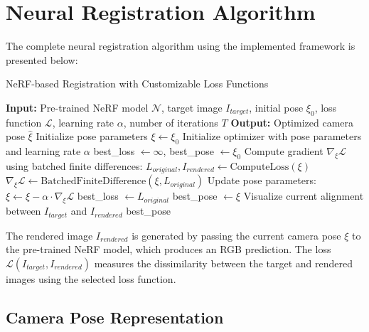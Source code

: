 \section{Neural Registration Algorithm}

The complete neural registration algorithm using the implemented framework is presented below:

\begin{algorithm}[H]
\caption{NeRF-based Registration with Customizable Loss Functions}
\begin{algorithmic}[1]
\State \textbf{Input:} Pre-trained NeRF model $\mathcal{N}$, target image $I_{target}$, initial pose $\xi_0$, loss function $\mathcal{L}$, learning rate $\alpha$, number of iterations $T$
\State \textbf{Output:} Optimized camera pose $\hat{\xi}$
\State Initialize pose parameters $\xi \gets \xi_0$
\State Initialize optimizer with pose parameters and learning rate $\alpha$
\State best\_loss $\gets \infty$, best\_pose $\gets \xi_0$
    \State Compute gradient $\nabla_{\xi} \mathcal{L}$ using batched finite differences:
    \State \hspace{\algorithmicindent} $L_{original}, I_{rendered} \gets \text{ComputeLoss}(\xi)$ 
    \State \hspace{\algorithmicindent} $\nabla_{\xi} \mathcal{L} \gets \text{BatchedFiniteDifference}(\xi, L_{original})$
    \State Update pose parameters: $\xi \gets \xi - \alpha \cdot \nabla_{\xi} \mathcal{L}$ 
        \State best\_loss $\gets L_{original}$
        \State best\_pose $\gets \xi$
    \EndIf
        \State Visualize current alignment between $I_{target}$ and $I_{rendered}$
    \EndIf
\EndFor
\State \Return best\_pose
\end{algorithmic}
\end{algorithm}

The rendered image $I_{rendered}$ is generated by passing the current camera pose $\xi$ to the pre-trained NeRF model, which produces an RGB prediction. The loss $\mathcal{L}(I_{target}, I_{rendered})$ measures the dissimilarity between the target and rendered images using the selected loss function.

\subsection{Camera Pose Representation}

